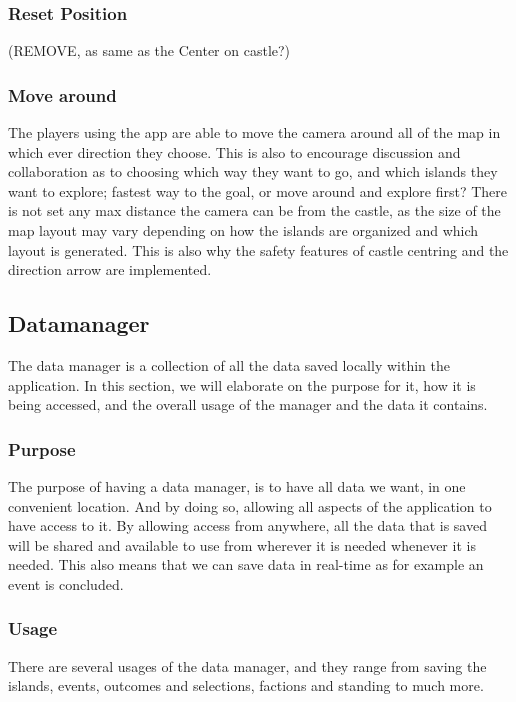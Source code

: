 \subsubsection{Reset Position}

(REMOVE, as same as the Center on castle?)
	
\subsubsection{Move around}

The players using the app are able to move the camera around all of the map in which ever direction they choose. This is also to encourage discussion and collaboration as to choosing which way they want to go, and which islands they want to explore; fastest way to the goal, or move around and explore first?
There is not set any max distance the camera can be from the castle, as the size of the map layout may vary depending on how the islands are organized and which layout is generated. This is also why the safety features of castle centring and the direction arrow are implemented.

\subsection{Datamanager}

The data manager is a collection of all the data saved locally within the application. In this section, we will elaborate on the purpose for it, how it is being accessed, and the overall usage of the manager and the data it contains.

\subsubsection{Purpose}
	
The purpose of having a data manager, is to have all data we want, in one convenient location. And by doing so, allowing all aspects of the application to have access to it. By allowing access from anywhere, all the data that is saved will be shared and available to use from wherever it is needed whenever it is needed. This also means that we can save data in real-time as for example an event is concluded.

\subsubsection{Usage}

There are several usages of the data manager, and they range from saving the islands, events, outcomes and selections, factions and standing to much more.

